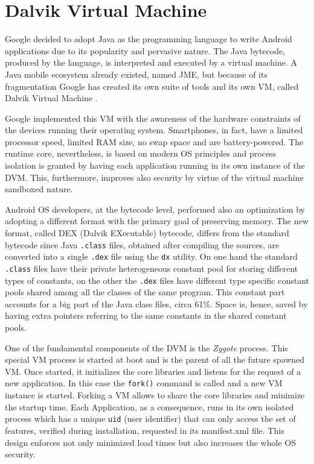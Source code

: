 \section{Dalvik Virtual Machine}
\label{sec:bg_dalvik}

Google decided to adopt Java as the programming language to write
Android applications due to its popularity and pervasive nature. The
Java bytecode, produced by the language, is interpreted and executed
by a virtual machine. A Java mobile ecosystem already existed, named
JME, but because of its fragmentation Google has created its own suite
of tools and its own VM, called Dalvik Virtual Machine \cite{ref14}.

Google implemented this VM with the awareness of the hardware
constraints of the devices running their operating
system. Smartphones, in fact, have a limited processor speed, limited
RAM size, no swap space and are battery-powered. The runtime core,
nevertheless, is based on modern OS principles and process isolation
is granted by having each application running in its own instance of
the DVM. This, furthermore, improves also security by virtue of the
virtual machine sandboxed nature.

Android OS developers, at the bytecode level, performed also an
optimization by adopting a different format with the primary goal of
preserving memory. The new format, called DEX (Dalvik EXecutable)
bytecode, differs from the standard bytecode since Java \texttt{.class} files,
obtained after compiling the sources, are converted into a single \texttt{.dex}
file using the \texttt{dx} utility. On one hand the standard \texttt{.class} files
have their private heterogeneous constant pool for storing different
types of constants, on the other the \texttt{.dex} files have different type
specific constant pools shared among all the classes of the same
program. This constant part accounts for a big part of the Java class
files, circa 61\%. Space is, hence, saved by having extra pointers
referring to the same constants in the shared constant pools.

One of the fundamental components of the DVM is the \emph{Zygote}
process. This special VM process is started at boot and is the parent
of all the future spawned VM. Once started, it initializes the core
libraries and listens for the request of a new application. In this
case the \texttt{fork()} command is called and a new VM instance is
started. Forking a VM allows to share the core libraries and minimize
the startup time. Each Application, as a consequence, runs in its own
isolated process which has a unique \texttt{uid} (user identifier) that can
only access the set of features, verified during installation,
requested in its manifest.xml file. This design enforces not only
minimized load times but also increases the whole OS security.

